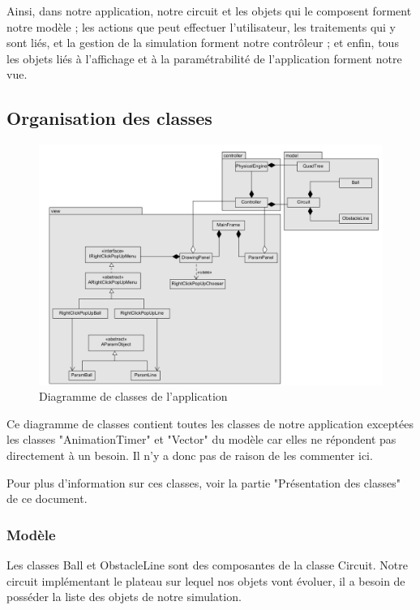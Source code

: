 \documentclass{report}
\begin{document}
Ainsi, dans notre application, notre circuit et les objets qui le composent forment notre modèle ; les actions que peut effectuer l'utilisateur, les traitements qui y sont liés, et la gestion de la simulation forment notre contrôleur ; et enfin, tous les objets liés à l'affichage et à la paramétrabilité de l'application forment notre vue.

\subsection{Organisation des classes}

\begin{figure}[H]
\centering
\includegraphics[scale=0.65]{uml.png}
\caption{Diagramme de classes de l'application}
\end{figure}

Ce diagramme de classes contient toutes les classes de notre application exceptées les classes "AnimationTimer" et "Vector" du modèle car elles ne répondent pas directement à un besoin. Il n'y a donc pas de raison de les commenter ici.

Pour plus d'information sur ces classes, voir la partie "Présentation des classes" de ce document.

\subsubsection{Modèle}

Les classes Ball et ObstacleLine sont des composantes de la classe Circuit. Notre circuit implémentant le plateau sur lequel nos objets vont évoluer, il a besoin de posséder la liste des objets de notre simulation.
\end{document}
